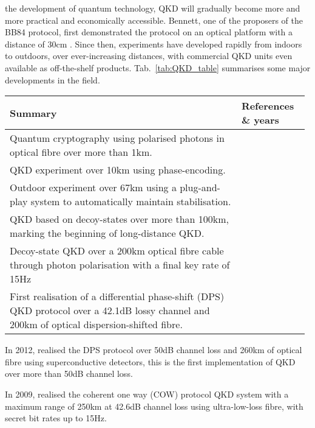  the development of quantum technology, QKD will gradually become more and more practical and economically accessible. Bennett, one of the proposers of the BB84 protocol, first demonstrated the protocol on an optical platform with a distance of 30cm \cite{bib:JC_5_3}. Since then, experiments have developed rapidly from indoors to outdoors, over ever-increasing distances, with commercial QKD units even available as off-the-shelf products. Tab.~\ref{tab:QKD_table} summarises some major developments in the field.

\begin{table*}[!htbp]
\begin{tabular}{|p{0.755\linewidth}|p{0.22\linewidth}|}
	\hline
	Summary & References \& years \\
	\hline \hline
	Quantum cryptography using polarised photons in optical fibre over more than 1km. & \cite{bib:EL_23_383} \\
	\hline
	QKD experiment over 10km using phase-encoding. & \cite{bib:EL_29_634} \\
	\hline
	Outdoor experiment over 67km using a plug-and-play system to automatically maintain stabilisation. & \cite{bib:Arx0203118} \\
	\hline
	QKD based on decoy-states over more than 100km, marking the beginning of long-distance QKD. & \cite{bib:PRL_98_010505, bib:PRL_09_010503x, bib:PRL_98_010504} \\
	\hline
	Decoy-state QKD over a 200km optical fibre cable through photon polarisation with a final key rate of 15Hz & \cite{bib:OptExp_18_8587} \\
	\hline
	First realisation of a differential phase-shift (DPS) QKD protocol over a 42.1dB lossy channel and 200km of optical dispersion-shifted fibre. & \cite{bib:NP_1_343} \\
	\hline
\end{tabular}
\captionspacetab \caption{Developments in experimental QKD.} \label{tab:QKD_table}
\end{table*}

In 2012, \cite{bib:OL_37_1008} realised the DPS protocol over 50dB channel loss and 260km of optical fibre using superconductive detectors, this is the first implementation of QKD over more than 50dB channel loss.

In 2009, \cite{bib:NJP_11_075003} realised the coherent one way (COW) protocol QKD system with a maximum range of 250km at 42.6dB channel loss using ultra-low-loss fibre, with secret bit rates up to 15Hz.
 
